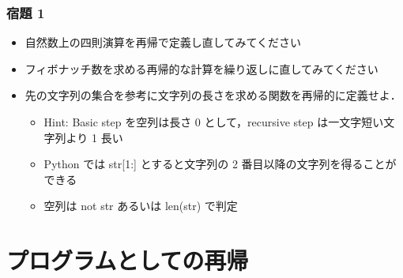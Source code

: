 \begin{frame}[fragile]
\frametitle{宿題 1}
  \begin{itemize}
\item 自然数上の四則演算を再帰で定義し直してみてください
\item フィボナッチ数を求める再帰的な計算を繰り返しに直してみてください
\item 先の文字列の集合を参考に文字列の長さを求める関数を再帰的に定義せよ．
    \begin{itemize}
\item Hint: Basic step を空列は長さ 0 として，recursive step は一文字短い文字列より 1 長い
\item Python では str[1:] とすると文字列の 2 番目以降の文字列を得ることができる
\item 空列は not str  あるいは len(str) で判定
    \end{itemize}
  \end{itemize}
\end{frame}
\section{プログラムとしての再帰}
